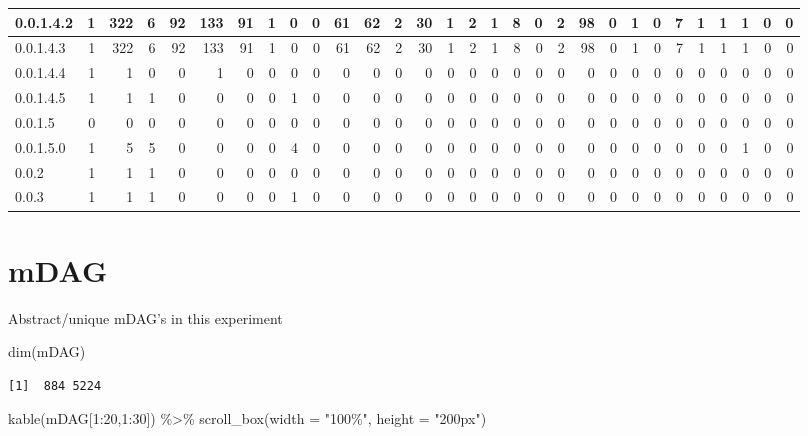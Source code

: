 \documentclass[
  letterpaper,
  DIV=11,
  numbers=noendperiod]{scrreprt}
\newenvironment{Shaded}{\begin{snugshade}}{\end{snugshade}}
\newcommand{\AttributeTok}[1]{\textcolor[rgb]{0.40,0.45,0.13}{#1}}
\newcommand{\DecValTok}[1]{\textcolor[rgb]{0.68,0.00,0.00}{#1}}
\newcommand{\FunctionTok}[1]{\textcolor[rgb]{0.28,0.35,0.67}{#1}}
\newcommand{\NormalTok}[1]{\textcolor[rgb]{0.00,0.23,0.31}{#1}}
\newcommand{\SpecialCharTok}[1]{\textcolor[rgb]{0.37,0.37,0.37}{#1}}
\newcommand{\StringTok}[1]{\textcolor[rgb]{0.13,0.47,0.30}{#1}}
\begin{document}
\begin{tabular}{l|r|r|r|r|r|r|r|r|r|r|r|r|r|r|r|r|r|r|r|r|r|r|r|r|r|r|r|r|r}
\hline
0.0.1.4.2 & 1 & 322 & 6 & 92 & 133 & 91 & 1 & 0 & 0 & 61 & 62 & 2 & 30 & 1 & 2 & 1 & 8 & 0 & 2 & 98 & 0 & 1 & 0 & 7 & 1 & 1 & 1 & 0 & 0\\
\hline
0.0.1.4.3 & 1 & 322 & 6 & 92 & 133 & 91 & 1 & 0 & 0 & 61 & 62 & 2 & 30 & 1 & 2 & 1 & 8 & 0 & 2 & 98 & 0 & 1 & 0 & 7 & 1 & 1 & 1 & 0 & 0\\
\hline
0.0.1.4.4 & 1 & 1 & 0 & 0 & 1 & 0 & 0 & 0 & 0 & 0 & 0 & 0 & 0 & 0 & 0 & 0 & 0 & 0 & 0 & 0 & 0 & 0 & 0 & 0 & 0 & 0 & 0 & 0 & 0\\
\hline
0.0.1.4.5 & 1 & 1 & 1 & 0 & 0 & 0 & 0 & 1 & 0 & 0 & 0 & 0 & 0 & 0 & 0 & 0 & 0 & 0 & 0 & 0 & 0 & 0 & 0 & 0 & 0 & 0 & 0 & 0 & 0\\
\hline
0.0.1.5 & 0 & 0 & 0 & 0 & 0 & 0 & 0 & 0 & 0 & 0 & 0 & 0 & 0 & 0 & 0 & 0 & 0 & 0 & 0 & 0 & 0 & 0 & 0 & 0 & 0 & 0 & 0 & 0 & 0\\
\hline
0.0.1.5.0 & 1 & 5 & 5 & 0 & 0 & 0 & 0 & 4 & 0 & 0 & 0 & 0 & 0 & 0 & 0 & 0 & 0 & 0 & 0 & 0 & 0 & 0 & 0 & 0 & 0 & 0 & 1 & 0 & 0\\
\hline
0.0.2 & 1 & 1 & 1 & 0 & 0 & 0 & 0 & 0 & 0 & 0 & 0 & 0 & 0 & 0 & 0 & 0 & 0 & 0 & 0 & 0 & 0 & 0 & 0 & 0 & 0 & 0 & 0 & 0 & 0\\
\hline
0.0.3 & 1 & 1 & 1 & 0 & 0 & 0 & 0 & 1 & 0 & 0 & 0 & 0 & 0 & 0 & 0 & 0 & 0 & 0 & 0 & 0 & 0 & 0 & 0 & 0 & 0 & 0 & 0 & 0 & 0\\
\hline
\end{tabular}

\hypertarget{mdag}{%
\section*{mDAG}\label{mdag}}


Abstract/unique mDAG's in this experiment

\begin{Shaded}
\begin{Highlighting}[]
\FunctionTok{dim}\NormalTok{(mDAG)}
\end{Highlighting}
\end{Shaded}

\begin{verbatim}
[1]  884 5224
\end{verbatim}

\begin{Shaded}
\begin{Highlighting}[]
\FunctionTok{kable}\NormalTok{(mDAG[}\DecValTok{1}\SpecialCharTok{:}\DecValTok{20}\NormalTok{,}\DecValTok{1}\SpecialCharTok{:}\DecValTok{30}\NormalTok{]) }\SpecialCharTok{\%\textgreater{}\%}   \FunctionTok{scroll\_box}\NormalTok{(}\AttributeTok{width =} \StringTok{"100\%"}\NormalTok{, }\AttributeTok{height =} \StringTok{"200px"}\NormalTok{)}
\end{Highlighting}
\end{Shaded}
\end{document}
